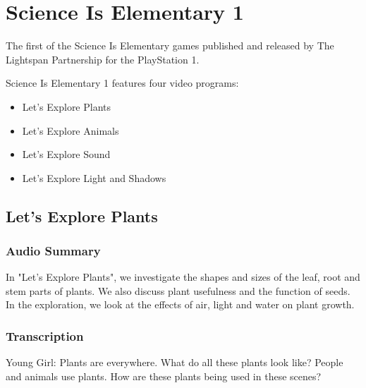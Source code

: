 \chapter{Science Is Elementary 1}


The first of the Science Is Elementary games published and released by The Lightspan Partnership for the PlayStation 1.

Science Is Elementary 1 features four video programs:

\begin{itemize}
    \item Let's Explore Plants
    \item Let's Explore Animals
    \item Let's Explore Sound
    \item Let's Explore Light and Shadows
\end{itemize}

\clearpage
\newpage

\section{Let's Explore Plants}

\subsection{Audio Summary}

In "Let's Explore Plants", we investigate the shapes and sizes of the leaf, root and stem parts of plants. We also discuss plant usefulness and the function of seeds. In the exploration, we look at the effects of air, light and water on plant growth.

\subsection{Transcription}

Young Girl: Plants are everywhere. What do all these plants look like? People and animals use plants. How are these plants being used in these scenes?

